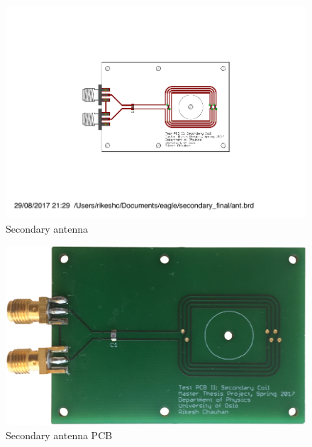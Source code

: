 \documentclass[12pt,a4paper,UKenglish]{report}
\begin{document}
\begin{appendices}
\begin{figure} [!htbp]	%
 	\centering
  	\includegraphics[width=1\textwidth]{appendix/pcb_sec.pdf} 
 	\caption{Secondary antenna} 
	\label{fig:appen_secondary} 
\end{figure}

\begin{figure} [!htbp]	%
 	\centering
  	\includegraphics[width=1\textwidth]{pcb/test_sec.png} 
 	\caption{Secondary antenna PCB} 
	\label{fig:appen_secondary_pcb} 
\end{figure}


\end{appendices}
\end{document}

